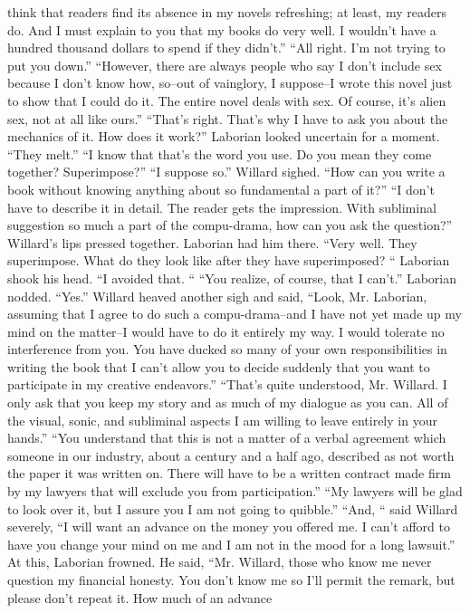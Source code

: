 \documentclass[a4paper,12pt]{article}
\begin{document}
think that readers find its absence in my novels refreshing; at least, my readers do. And I must explain to
you that my books do very well. I wouldn’t have a hundred thousand dollars to spend if they didn’t.”
“All right. I’m not trying to put you down.”
“However, there are always people who say I don’t include sex because I don’t know how, so--out
of vainglory, I suppose--I wrote this novel just to show that I could do it. The entire novel deals with sex.
Of course, it’s alien sex, not at all like ours.”
“That’s right. That’s why I have to ask you about the mechanics of it. How does it work?”
Laborian looked uncertain for a moment. “They melt.”
“I know that that’s the word you use. Do you mean they come together? Superimpose?”
“I suppose so.”
Willard sighed. “How can you write a book without knowing anything about so fundamental a
part of it?”
“I don’t have to describe it in detail. The reader gets the impression. With subliminal suggestion
so much a part of the compu-drama, how can you ask the question?”
Willard’s lips pressed together. Laborian had him there. “Very well. They superimpose. What do
they look like after they have superimposed? “
Laborian shook his head. “I avoided that. “
“You realize, of course, that I can’t.” Laborian nodded. “Yes.”
Willard heaved another sigh and said, “Look, Mr. Laborian, assuming that I agree to do such a
compu-drama--and I have not yet made up my mind on the matter--I would have to do it entirely my way. I
would tolerate no interference from you. You have ducked so many of your own responsibilities in writing
the book that I can’t allow you to decide suddenly that you want to participate in my creative endeavors.”
“That’s quite understood, Mr. Willard. I only ask that you keep my story and as much of my
dialogue as you can. All of the visual, sonic, and subliminal aspects I am willing to leave entirely in your
hands.”
“You understand that this is not a matter of a verbal agreement which someone in our industry,
about a century and a half ago, described as not worth the paper it was written on. There will have to be a
written contract made firm by my lawyers that will exclude you from participation.”
“My lawyers will be glad to look over it, but I assure you I am not going to quibble.”
“And, “ said Willard severely, “I will want an advance on the money you offered me. I can’t afford
to have you change your mind on me and I am not in the mood for a long lawsuit.”
At this, Laborian frowned. He said, “Mr. Willard, those who know me never question my financial
honesty. You don’t know me so I’ll permit the remark, but please don’t repeat it. How much of an advance
\end{document}
